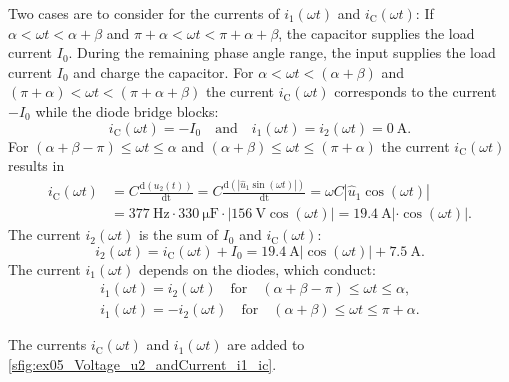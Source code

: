 \begin{solutionblock}
    Two cases are to consider for the currents of $i_\mathrm{1}(\omega t)$ and  $i_\mathrm{C}(\omega t)$: If $\alpha<\omega t<\alpha+\beta$
    and $\pi+\alpha<\omega t<\pi+\alpha+\beta$, the capacitor supplies the load current $I_{\mathrm{0}}$.
    During the remaining phase angle range, the input supplies the load current $I_{\mathrm{0}}$ and charge the capacitor.
    For $\alpha<\omega t<(\alpha+\beta)$ and $(\pi+\alpha)<\omega t<(\pi+\alpha+\beta)$ the current $i_\mathrm{C}(\omega t)$ 
    corresponds to the current $-I_{\mathrm{0}}$ while the diode bridge blocks:
    \begin{equation} 
        i_\mathrm{C}(\omega t)=-I_{\mathrm{0}} \quad \text{and} \quad i_\mathrm{1}(\omega t)= i_\mathrm{2}(\omega t)= \SI{0}{\ampere}.
    \end{equation}
    For $(\alpha+\beta-\pi)\leq\omega t\leq\alpha$ and $(\alpha+\beta)\leq\omega t\leq(\pi+\alpha)$ the current $i_\mathrm{C}(\omega t)$ results in
    \begin{equation}
        \begin{aligned}
            i_\mathrm{C}(\omega t)&=C\frac{\mathrm{d}(u_\mathrm{2}(t))}{\mathrm{dt}}=C\frac{\mathrm{d}(\left| \hat{u}_\mathrm{1}\sin(\omega t)\right|)}{\mathrm{dt}}
            = \omega C \left|\hat{u}_\mathrm{1}\cos(\omega t)\right|  \\
            &= \SI{377}{\hertz} \cdot \SI{330}{\micro\farad} \cdot  \left|\SI{156}{\volt}\cos(\omega t)\right|
            =\SI{19.4}{\ampere}\left| \cdot \cos(\omega t)\right|.
        \end{aligned}
    \end{equation}
    The current $i_\mathrm{2}(\omega t)$ is the sum of $I_{\mathrm{0}}$ and $i_\mathrm{C}(\omega t)$:
    \begin{equation} 
        i_\mathrm{2}(\omega t)=i_\mathrm{C}(\omega t) + I_{\mathrm{0}}=\SI{19.4}{\ampere}\left|\cos(\omega t)\right| + \SI{7.5}{\ampere}.
    \end{equation}
    The current $i_\mathrm{1}(\omega t)$ depends on the diodes, which conduct:
    \begin{equation}
        \begin{split}
            i_\mathrm{1}(\omega t)=i_\mathrm{2}(\omega t) \quad \text{for} \quad (\alpha+\beta-\pi)\leq\omega t\leq\alpha, \\
            i_\mathrm{1}(\omega t)=-i_\mathrm{2}(\omega t) \quad \text{for} \quad (\alpha+\beta)\leq\omega t\leq\pi+\alpha.
        \end{split}
    \end{equation}

    The currents $i_\mathrm{C}(\omega t)$ and $i_\mathrm{1}(\omega t)$ are added to \autoref{sfig:ex05_Voltage_u2_andCurrent_i1_ic}.

\end{solutionblock}


